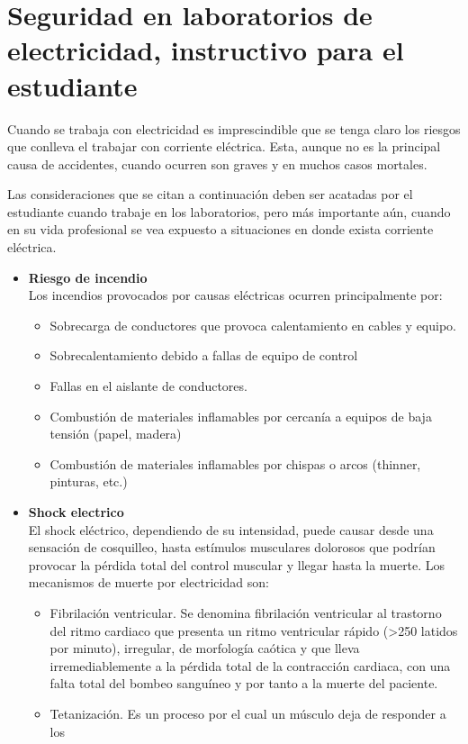 \documentclass[12pt,letterpaper]{report}
\begin{document}
\chapter{Seguridad en laboratorios de electricidad, instructivo para el estudiante}
Cuando se trabaja con electricidad es imprescindible que se tenga claro los
riesgos que conlleva el trabajar con corriente eléctrica. Esta, aunque no es la
principal causa de accidentes, cuando ocurren son graves y en muchos casos
mortales.

Las consideraciones que se citan a continuación deben ser acatadas por el
estudiante cuando trabaje en los laboratorios, pero más importante aún, cuando
en su vida profesional se vea expuesto a situaciones en donde exista corriente
eléctrica.

\begin{itemize}
\item \textbf{Riesgo de incendio}\\
Los incendios provocados por causas eléctricas ocurren principalmente por:
\begin{itemize}
\item Sobrecarga de conductores que provoca calentamiento en cables y equipo.
\item Sobrecalentamiento debido a fallas de equipo de control
\item Fallas en el aislante de conductores.
\item Combustión de materiales inflamables por cercanía a equipos de baja
tensión (papel, madera)
\item Combustión de materiales inflamables por chispas o arcos (thinner,
pinturas, etc.)
\end{itemize}
\item \textbf{Shock electrico}\\
El shock eléctrico, dependiendo de su intensidad, puede causar desde una
sensación de cosquilleo, hasta estímulos musculares dolorosos que podrían
provocar la pérdida total del control muscular y llegar hasta la muerte.
Los mecanismos de muerte por electricidad son:
\begin{itemize}
\item Fibrilación ventricular. Se denomina fibrilación ventricular al trastorno del
ritmo cardiaco que presenta un ritmo ventricular rápido (>250 latidos por
minuto), irregular, de morfología caótica y que lleva irremediablemente a la
pérdida total de la contracción cardiaca, con una falta total del bombeo
sanguíneo y por tanto a la muerte del paciente.
\item Tetanización. Es un proceso por el cual un músculo deja de responder a los

\end{itemize}
\end{itemize}
\end{document}

